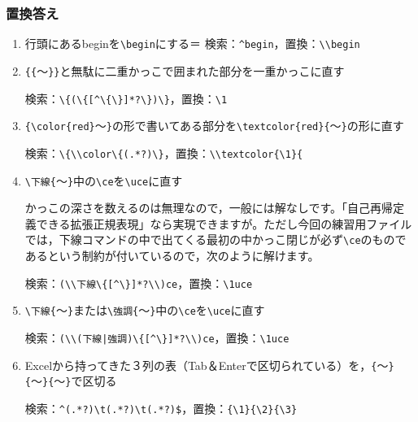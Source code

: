 \documentclass[10pt,dvipdfmx]{beamer}
\makeatletter
\def\verbstart{{\pxqgg@TI\pxqgg@cwm}\verb}
\def\verbend{{\pxqgg@TI\pxqgg@cwm}}
\makeatother
\begin{document}
\begin{frame}[t,fragile]
 \frametitle{置換答え}

\small
\begin{enumerate}
\item 行頭にあるbeginを\verbstart|\begin|\verbend にする＝{\color{blue} 検索：\verbstart|^begin|\verbend ，置換：\verbstart|\\begin|\verbend }

\item \verbstart|{{|\verbend 〜\verbstart|}}|\verbend と無駄に二重かっこで囲まれた部分を一重かっこに直す

{\color{blue} 検索：\verbstart|\{(\{[^\{\}]*?\})\}|\verbend ，置換：\verbstart|\1|\verbend }

\item \verbstart|{\color{red}|\verbend 〜\verbstart|}|\verbend の形で書いてある部分を\verbstart|\textcolor{red}{|\verbend 〜\verbstart|}|\verbend の形に直す

{\color{blue} 検索：\verbstart|\{\\color\{(.*?)\}|\verbend ，置換：\verbstart|\\textcolor{\1}{|\verbend }

\item \verbstart|\下線{|\verbend 〜\verbstart|}|\verbend 中の\verbstart|\ce|\verbend を\verbstart|\uce|\verbend に直す

かっこの深さを数えるのは無理なので，\alert{一般には解なし}です。「自己再帰定義できる拡張正規表現」なら実現できますが。ただし今回の練習用ファイルでは，下線コマンドの中で出てくる最初の中かっこ閉じが必ず\verbstart|\ce|\verbend のものであるという制約が付いているので，次のように解けます。

{\color{blue} 検索：\verbstart|(\\下線\{[^\}]*?\\)ce|\verbend ，置換：\verbstart|\1uce|\verbend }

\item \verbstart|\下線{|\verbend 〜\verbstart|}|\verbend または\verbstart|\強調{|\verbend 〜\verbstart|}|\verbend 中の\verbstart|\ce|\verbend を\verbstart|\uce|\verbend に直す

{\color{blue} 検索：\verb+(\\(下線|強調)\{[^\}]*?\\)ce+，置換：\verbstart|\1uce|\verbend }

\item Excelから持ってきた３列の表（Tab＆Enterで区切られている）を，\verbstart|{|\verbend 〜\verbstart|}{|\verbend 〜\verbstart|}{|\verbend 〜\verbstart|}|\verbend で区切る

{\color{blue} 検索：\verbstart|^(.*?)\t(.*?)\t(.*?)$|\verbend ，置換：\verbstart|{\1}{\2}{\3}|\verbend }


\end{enumerate}

\end{frame}
\end{document}
